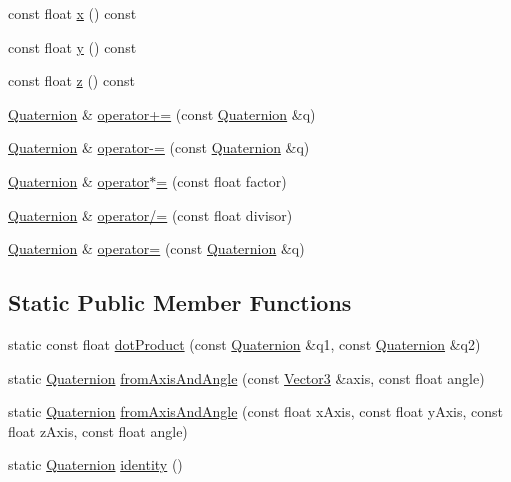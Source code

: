 \begin{DoxyCompactItemize}
\item 
const float \hyperlink{classprism_1_1_quaternion_ab3f80fc41a933a371b2861363997ce22}{x} () const 
\item 
const float \hyperlink{classprism_1_1_quaternion_a37023ce86684cb19287ec52cf27072f7}{y} () const 
\item 
const float \hyperlink{classprism_1_1_quaternion_a8af7b070028c48f61d1a76b1b49cbaac}{z} () const 
\item 
\hyperlink{classprism_1_1_quaternion}{Quaternion} \& \hyperlink{classprism_1_1_quaternion_a63df7ac020afde2cfdc615456d1f68a4}{operator+=} (const \hyperlink{classprism_1_1_quaternion}{Quaternion} \&q)
\item 
\hyperlink{classprism_1_1_quaternion}{Quaternion} \& \hyperlink{classprism_1_1_quaternion_a6b84915d37bf3804c6ea490016e32918}{operator-\/=} (const \hyperlink{classprism_1_1_quaternion}{Quaternion} \&q)
\item 
\hyperlink{classprism_1_1_quaternion}{Quaternion} \& \hyperlink{classprism_1_1_quaternion_a6f240e9d9209d183c2166dbad58d1205}{operator$\ast$=} (const float factor)
\item 
\hyperlink{classprism_1_1_quaternion}{Quaternion} \& \hyperlink{classprism_1_1_quaternion_ac441cba84443fb178c270d725af590ab}{operator/=} (const float divisor)
\item 
\hyperlink{classprism_1_1_quaternion}{Quaternion} \& \hyperlink{classprism_1_1_quaternion_adc5b6ae63ce35d2cb167cab99af01ede}{operator=} (const \hyperlink{classprism_1_1_quaternion}{Quaternion} \&q)
\end{DoxyCompactItemize}
\subsection*{Static Public Member Functions}
\begin{DoxyCompactItemize}
\item 
static const float \hyperlink{classprism_1_1_quaternion_ab8b97629ff83df584715ed470239e1bb}{dot\+Product} (const \hyperlink{classprism_1_1_quaternion}{Quaternion} \&q1, const \hyperlink{classprism_1_1_quaternion}{Quaternion} \&q2)
\item 
static \hyperlink{classprism_1_1_quaternion}{Quaternion} \hyperlink{classprism_1_1_quaternion_a1c7e89d8d53e4d64db8528dfb72e5e19}{from\+Axis\+And\+Angle} (const \hyperlink{classprism_1_1_vector3}{Vector3} \&axis, const float angle)
\item 
static \hyperlink{classprism_1_1_quaternion}{Quaternion} \hyperlink{classprism_1_1_quaternion_a9b672e780a381a00f309a3b5e6075809}{from\+Axis\+And\+Angle} (const float x\+Axis, const float y\+Axis, const float z\+Axis, const float angle)
\item 
static \hyperlink{classprism_1_1_quaternion}{Quaternion} \hyperlink{classprism_1_1_quaternion_a437a72c82f55bc7828f9fc5c6cef298d}{identity} ()
\end{DoxyCompactItemize}
